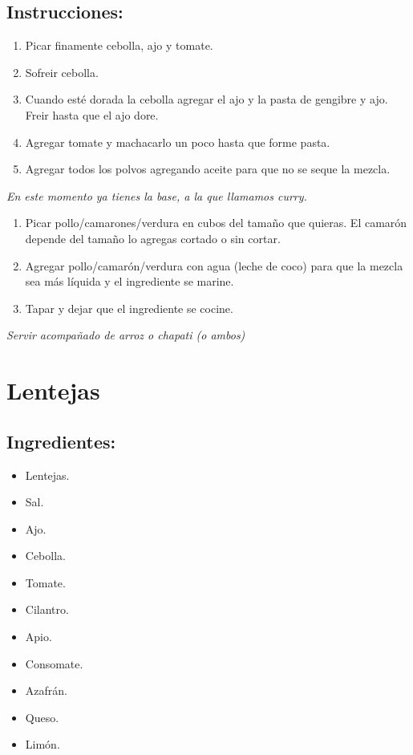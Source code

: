 \documentclass{book}
\begin{document}
\subsection*{Instrucciones:}
\begin{enumerate}
	\item Picar finamente cebolla, ajo y tomate.
	\item Sofreir cebolla.
	\item Cuando esté dorada la cebolla agregar el ajo y la pasta de gengibre y ajo.
		Freir hasta que el ajo dore.
	\item Agregar tomate y machacarlo un poco hasta que forme pasta.
	\item Agregar todos los polvos agregando aceite para que no se seque la mezcla.
\end{enumerate}
\textit{En este momento ya tienes la base, a la que llamamos curry.}
\begin{enumerate}
	\item Picar pollo/camarones/verdura en cubos del tamaño que quieras.
		El camarón depende del tamaño lo agregas cortado o sin cortar.
	\item Agregar pollo/camarón/verdura con agua (leche de coco) para que la mezcla sea más líquida y el ingrediente se marine.
	\item Tapar y dejar que el ingrediente se cocine.
\end{enumerate}
\textit{Servir acompañado de arroz o chapati (o ambos)}

\newpage
\section{Lentejas}
\subsection*{Ingredientes:}
\begin{itemize}
	\item Lentejas.
	\item Sal.
	\item Ajo.
	\item Cebolla.
	\item Tomate.
	\item Cilantro.
	\item Apio.
	\item Consomate.
	\item Azafrán.
	\item Queso.
	\item Limón.
\end{itemize}
\end{document}
